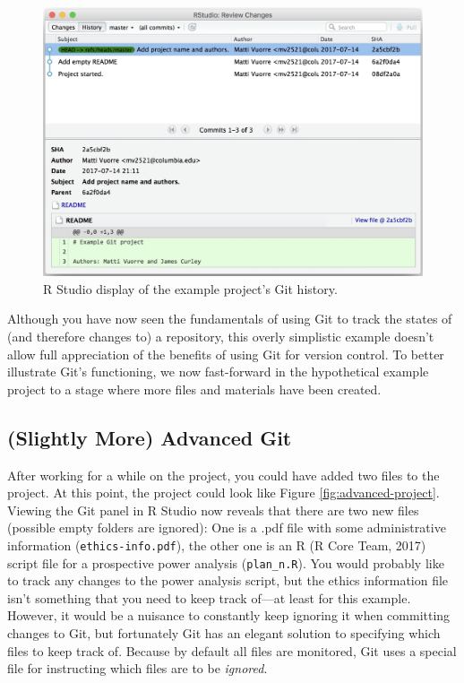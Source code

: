 \documentclass[
  american,
  ,doc,floatsintext]{apa6}
\begin{document}
\begin{figure}

{\centering \includegraphics{images/rstudio-git-4} 

}

\caption{R Studio display of the example project's Git history.}\label{fig:rstudio-git-4}
\end{figure}

Although you have now seen the fundamentals of using Git to track the states of (and therefore changes to) a repository, this overly simplistic example doesn't allow full appreciation of the benefits of using Git for version control. To better illustrate Git's functioning, we now fast-forward in the hypothetical example project to a stage where more files and materials have been created.

\hypertarget{slightly-more-advanced-git}{%
\subsection{(Slightly More) Advanced Git}\label{slightly-more-advanced-git}}

After working for a while on the project, you could have added two files to the project. At this point, the project could look like Figure \ref{fig:advanced-project}. Viewing the Git panel in R Studio now reveals that there are two new files (possible empty folders are ignored): One is a .pdf file with some administrative information (\texttt{ethics-info.pdf}), the other one is an R (R Core Team, 2017) script file for a prospective power analysis (\texttt{plan\_n.R}). You would probably like to track any changes to the power analysis script, but the ethics information file isn't something that you need to keep track of---at least for this example. However, it would be a nuisance to constantly keep ignoring it when committing changes to Git, but fortunately Git has an elegant solution to specifying which files to keep track of. Because by default all files are monitored, Git uses a special file for instructing which files are to be \emph{ignored}.
\end{document}
